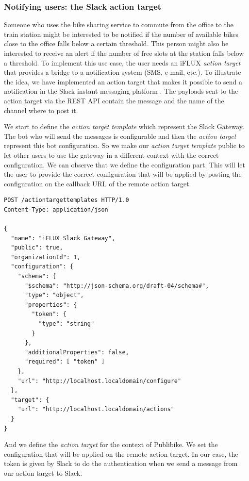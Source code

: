 \subsubsection{Notifying users: the Slack action target}
Someone who uses the bike sharing service to commute from the office to the train station might be interested to be notified if the number of available bikes close to the office falls below a certain threshold. This person might also be interested to receive an alert if the number of free slots at the station falls below a threshold. To implement this use case, the user needs an iFLUX \emph{action target} that provides a bridge to a notification system (SMS, e-mail, etc.). To illustrate the idea, we have implemented an action target that makes it possible to send a notification in the Slack instant messaging platform \cite{slack}. The payloads sent to the action target via the REST API contain the message and the name of the channel where to post it. 

We start to define the \emph{action target template} which represent the Slack Gateway. The bot who will send the messages is configurable and then the \emph{action target} represent this bot configuration. So we make our \emph{action target template} public to let other users to use the gateway in a different context with the correct configuration. We can observe that we define the configuration part. This will let the user to provide the correct configuration that will be applied by posting the configuration on the callback URL of the remote action target.

\begin{lstlisting}
POST /actiontargettemplates HTTP/1.0
Content-Type: application/json

{
  "name": "iFLUX Slack Gateway",
  "public": true,
  "organizationId": 1,
  "configuration": {
    "schema": {
      "$schema": "http://json-schema.org/draft-04/schema#",
      "type": "object",
      "properties": {
        "token": {
          "type": "string"
        }
      },
      "additionalProperties": false,
      "required": [ "token" ]
    },
    "url": "http://localhost.localdomain/configure"
  },
  "target": {
    "url": "http://localhost.localdomain/actions"
  }
}
\end{lstlisting}

And we define the \emph{action target} for the context of Publibike. We set the configuration that will be applied on the remote action target. In our case, the token is given by Slack to do the authentication when we send a message from our action target to Slack.

